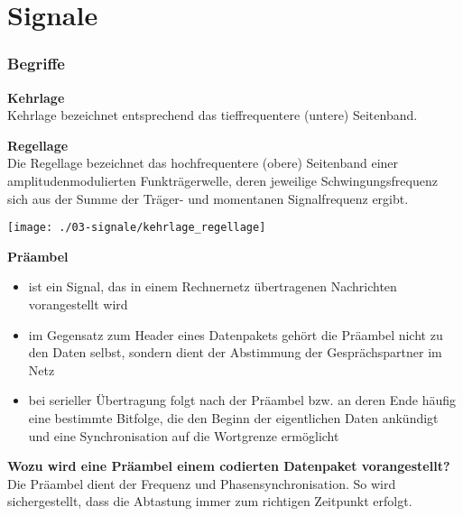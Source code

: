 

\section{Signale}
\subsubsection{Begriffe}
\textbf{Kehrlage}\\
Kehrlage bezeichnet entsprechend das tieffrequentere (untere) Seitenband.

\textbf{Regellage}\\
Die Regellage bezeichnet das hochfrequentere (obere) Seitenband einer amplitudenmodulierten Funkträgerwelle, deren jeweilige Schwingungsfrequenz sich aus der Summe der Träger- und momentanen Signalfrequenz ergibt.\\

\begin{center}
    \vspace{-8pt}
    \texttt{[image: ./03-signale/kehrlage\_regellage]}
    \vspace{-8pt}
\end{center}

\textbf{Präambel}\\
\begin{itemize}
    \item ist ein Signal, das in einem Rechnernetz übertragenen Nachrichten vorangestellt wird
    \item im Gegensatz zum Header eines Datenpakets gehört die Präambel nicht zu den Daten selbst, sondern dient der Abstimmung der Gesprächspartner im Netz
    \item bei serieller Übertragung folgt nach der Präambel bzw. an deren Ende häufig eine bestimmte Bitfolge, die den Beginn der eigentlichen Daten ankündigt und eine Synchronisation auf die Wortgrenze ermöglicht\\
\end{itemize}

\textbf{Wozu wird eine Präambel einem codierten Datenpaket vorangestellt?}\\
Die Präambel dient der Frequenz und Phasensynchronisation. So wird sichergestellt, dass die Abtastung immer zum richtigen Zeitpunkt erfolgt.\\

